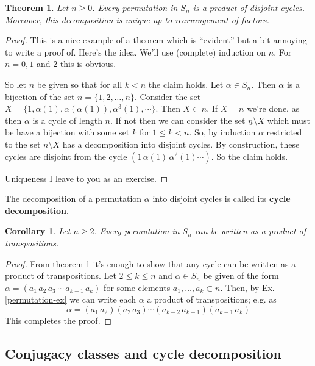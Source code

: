 \documentclass[12pt]{article}
\numberwithin{equation}{subsection}
\newtheorem{thm}[subsection]{Theorem}
\newtheorem{corollary}[subsection]{Corollary}
\theoremstyle{note}
\begin{document}
\begin{thm}\label{disjoint-cycles}
	Let $n\geq 0$. Every permutation in $S_n$ is a product of disjoint cycles. Moreover, this decomposition is unique up to rearrangement of factors. 
\end{thm}
\begin{proof}
	This is a nice example of a theorem which is ``evident'' but a bit annoying to write a proof of. Here's the idea. We'll use (complete) induction on $n$. For $n=0,1$ and $2$ this is obvious. 
	
	So let $n$ be given so that for all $k<n$ the claim holds. Let $\alpha\in S_n$. Then $\alpha$ is a bijection of the set $\underline{n}=\{1,2,\dots, n\}$. Consider the set $X=\{1,\alpha(1), \alpha(\alpha(1)), \alpha^3(1),\cdots\}$. Then $X\subset \underline{n}$. If $X=\underline{n}$ we're done, as then $\alpha$ is a cycle of length $n$. If not then we can consider the set $\underline{n}\setminus X$ which must be have a bijection with some set $\underline{k}$ for $1\leq k < n$. So, by induction $\alpha$ restricted to the set $\underline{n}\setminus X$ has a decomposition into disjoint cycles. By construction, these cycles are disjoint from the cycle $(1 \, \alpha(1) \, \alpha^2(1) \cdots)$. So the claim holds. 
	
		Uniqueness I leave to you as an exercise. 
\end{proof}

The decomposition of a permutation $\alpha$ into disjoint cycles is called its \textbf{cycle decomposition}. 
\begin{corollary} \label{trans-generate-Sn}
	Let $n\geq 2$. Every permutation in $S_n$ can be written as a product of transpositions.
\end{corollary}
\begin{proof}
	From theorem \ref{disjoint-cycles} it's enough to show that any cycle can be written as a product of transpositions. Let $2\leq k\leq n$ and $\alpha \in S_n$ be given of the form $\alpha=(a_1\, a_2\, a_3\,\cdots \, a_{k-1}\, a_k)$ for some elements $a_1,\dots,a_k\subset \underline{n}$. Then, by Ex. \ref{permutation-ex} we can write each $\alpha$ a product of transpositions; e.g. as\[\alpha= (a_{1} \, a_2)(a_2\, a_3) \cdots (a_{k-2} \, a_{k-1} )(a_{k-1} \, a_k)\]This completes the proof.
\end{proof} 
\subsection{Conjugacy classes and cycle decomposition}
\end{document}

